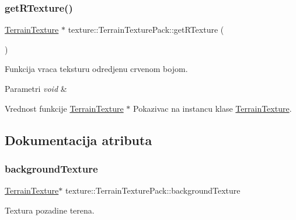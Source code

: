 \subsubsection{\texorpdfstring{get\+R\+Texture()}{getRTexture()}}
{\footnotesize\ttfamily \hyperlink{classtexture_1_1TerrainTexture}{Terrain\+Texture} $\ast$ texture\+::\+Terrain\+Texture\+Pack\+::get\+R\+Texture (\begin{DoxyParamCaption}{ }\end{DoxyParamCaption})}



Funkcija vraca teksturu odredjenu crvenom bojom. 


\begin{DoxyParams}{Parametri}
{\em void} & \\
\hline
\end{DoxyParams}
\begin{DoxyReturn}{Vrednost funkcije}
\hyperlink{classtexture_1_1TerrainTexture}{Terrain\+Texture} $\ast$ Pokazivac na instancu klase \hyperlink{classtexture_1_1TerrainTexture}{Terrain\+Texture}. 
\end{DoxyReturn}


\subsection{Dokumentacija atributa}
\mbox{\label{classtexture_1_1TerrainTexturePack_a5fcc575543662461b66195cfa21875b1}} 
\subsubsection{\texorpdfstring{background\+Texture}{backgroundTexture}}
{\footnotesize\ttfamily \hyperlink{classtexture_1_1TerrainTexture}{Terrain\+Texture}$\ast$ texture\+::\+Terrain\+Texture\+Pack\+::background\+Texture\hspace{0.3cm}{\ttfamily [private]}}



Textura pozadine terena. 

\mbox{\label{classtexture_1_1TerrainTexturePack_a004a654fdda8c9f552f40986e2dd072f}} 
